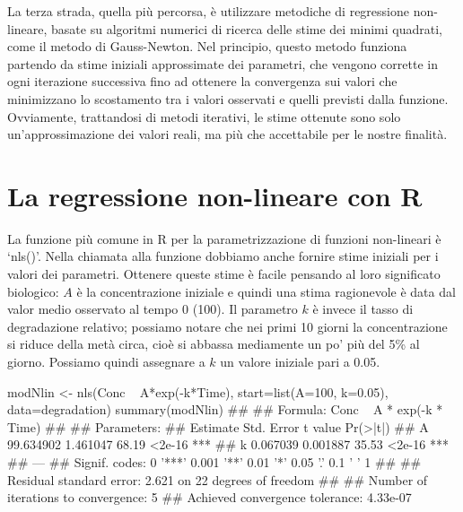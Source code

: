 \documentclass[a4paper,12pt,oneside]{book}
\newenvironment{Shaded}{}{}
\newcommand{\KeywordTok}[1]{#1}
\newcommand{\DataTypeTok}[1]{#1}
\newcommand{\DecValTok}[1]{#1}
\newcommand{\FloatTok}[1]{#1}
\newcommand{\StringTok}[1]{#1}
\newcommand{\CommentTok}[1]{#1}
\newcommand{\OperatorTok}[1]{#1}
\newcommand{\NormalTok}[1]{#1}
\begin{document}
La terza strada, quella più percorsa, è utilizzare metodiche di regressione non-lineare, basate su algoritmi numerici di ricerca delle stime dei minimi quadrati, come il metodo di Gauss-Newton. Nel principio, questo metodo funziona partendo da stime iniziali approssimate dei parametri, che vengono corrette in ogni iterazione successiva fino ad ottenere la convergenza sui valori che minimizzano lo scostamento tra i valori osservati e quelli previsti dalla funzione. Ovviamente, trattandosi di metodi iterativi, le stime ottenute sono solo un'approssimazione dei valori reali, ma più che accettabile per le nostre finalità.

\hypertarget{la-regressione-non-lineare-con-r}{%
\section{La regressione non-lineare con R}\label{la-regressione-non-lineare-con-r}}

La funzione più comune in R per la parametrizzazione di funzioni non-lineari è `nls()'. Nella chiamata alla funzione dobbiamo anche fornire stime iniziali per i valori dei parametri. Ottenere queste stime è facile pensando al loro significato biologico: \(A\) è la concentrazione iniziale e quindi una stima ragionevole è data dal valor medio osservato al tempo 0 (100). Il parametro \(k\) è invece il tasso di degradazione relativo; possiamo notare che nei primi 10 giorni la concentrazione si riduce della metà circa, cioè si abbassa mediamente un po' più del 5\% al giorno. Possiamo quindi assegnare a \(k\) un valore iniziale pari a 0.05.

\begin{Shaded}
\begin{Highlighting}[]
\NormalTok{modNlin <-}\StringTok{ }\KeywordTok{nls}\NormalTok{(Conc }\OperatorTok{~}\StringTok{ }\NormalTok{A}\OperatorTok{*}\KeywordTok{exp}\NormalTok{(}\OperatorTok{-}\NormalTok{k}\OperatorTok{*}\NormalTok{Time), }
               \DataTypeTok{start=}\KeywordTok{list}\NormalTok{(}\DataTypeTok{A=}\DecValTok{100}\NormalTok{, }\DataTypeTok{k=}\FloatTok{0.05}\NormalTok{), }
               \DataTypeTok{data=}\NormalTok{degradation)}
\KeywordTok{summary}\NormalTok{(modNlin)}
\CommentTok{## }
\CommentTok{## Formula: Conc ~ A * exp(-k * Time)}
\CommentTok{## }
\CommentTok{## Parameters:}
\CommentTok{##    Estimate Std. Error t value Pr(>|t|)    }
\CommentTok{## A 99.634902   1.461047   68.19   <2e-16 ***}
\CommentTok{## k  0.067039   0.001887   35.53   <2e-16 ***}
\CommentTok{## ---}
\CommentTok{## Signif. codes:  0 '***' 0.001 '**' 0.01 '*' 0.05 '.' 0.1 ' ' 1}
\CommentTok{## }
\CommentTok{## Residual standard error: 2.621 on 22 degrees of freedom}
\CommentTok{## }
\CommentTok{## Number of iterations to convergence: 5 }
\CommentTok{## Achieved convergence tolerance: 4.33e-07}
\end{Highlighting}
\end{Shaded}
\end{document}
